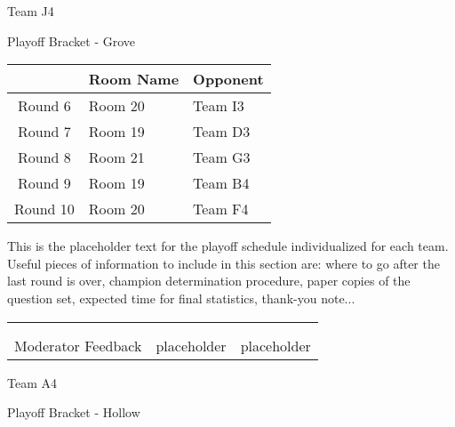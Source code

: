 \documentclass{article}%
\begin{document}
\newpage%
\begin{center}%
\begin{Huge}%
Team J4%
\end{Huge}%
\vspace*{12pt}%
\linebreak%
\begin{Large}%
Playoff Bracket {-} Grove%
\end{Large}%
\end{center}%
\vspace*{4pt}%
%
\begin{tabularx}{\textwidth}{|c|Y|Y|}%
\hline%
&Room Name&Opponent\\%
\hline%
Round 6&Room 20&Team I3\\%
Round 7&Room 19&Team D3\\%
Round 8&Room 21&Team G3\\%
Round 9&Room 19&Team B4\\%
Round 10&Room 20&Team F4\\%
\hline%
\end{tabularx}%
\vspace*{30pt}%
\linebreak%
This is the placeholder text for the playoff schedule individualized for each team. Useful pieces of information to include in this section are: where to go after the last round is over, champion determination procedure, paper copies of the question set, expected time for final statistics, thank{-}you note...%
\vspace*{30pt}%
\newline%
%
\begin{tabularx}{\textwidth}{YYY}%
  &  &  \\%
\\%
Moderator Feedback&placeholder&placeholder\\%
\end{tabularx}%
\newpage%
\begin{center}%
\begin{Huge}%
Team A4%
\end{Huge}%
\vspace*{12pt}%
\linebreak%
\begin{Large}%
Playoff Bracket {-} Hollow%
\end{Large}%
\end{center}%
\end{document}
